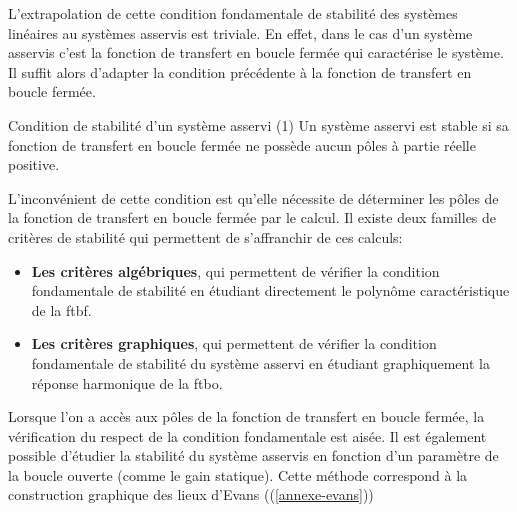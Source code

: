%    
L'extrapolation de cette condition fondamentale de stabilité des systèmes 
linéaires au systèmes asservis est triviale. En effet, dans le cas d'un 
système asservis c'est la fonction de transfert en boucle fermée qui 
caractérise le système. Il suffit alors d'adapter la condition précédente à la
fonction de transfert en boucle fermée.
\begin{criteria}{Condition de stabilité d'un système asservi (1)}
         Un système asservi est stable si sa fonction de transfert en 
         boucle fermée ne possède aucun pôles à partie réelle positive.
\end{criteria}
L'inconvénient de cette condition est qu'elle nécessite de déterminer les
pôles de la fonction de transfert en boucle fermée par le calcul. Il existe
deux familles de critères de stabilité qui permettent de s'affranchir de 
ces calculs:
\begin{itemize}
    \item \textbf{Les critères algébriques}, qui permettent de vérifier 
        la condition fondamentale de stabilité en étudiant directement 
        le polynôme caractéristique de la \gls{ftbf}.
    \item \textbf{Les critères graphiques}, qui permettent de vérifier 
        la condition fondamentale de stabilité du système asservi en 
        étudiant graphiquement la réponse harmonique de la \gls{ftbo}.
\end{itemize}
Lorsque l'on a accès aux pôles de la fonction de transfert en boucle fermée, la
vérification du respect de la condition fondamentale est aisée. Il est également
possible d'étudier la stabilité du système asservis en fonction d'un paramètre 
de la boucle ouverte (comme le gain statique). Cette méthode correspond à la 
construction graphique des lieux d'Evans ((\cref{annexe-evans}))
\newpage

\captionsetup{width=0.9\linewidth}

